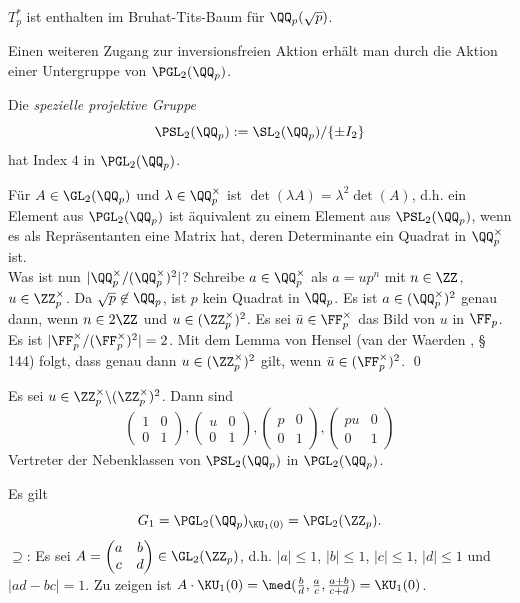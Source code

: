 $T_p^*$ ist enthalten im Bruhat-Tits-Baum für $\QQ_p(\sqrt{p})$.

Einen weiteren Zugang zur inversionsfreien Aktion erhält man
durch die Aktion einer Untergruppe von $\PGL_2(\QQ_p)$.

\BEM Die \emph{spezielle projektive Gruppe}
\[
\PSL_2(\QQ_p) := \SL_2(\QQ_p)/\{\pm I_2\}
\]
hat Index $4$ in $\PGL_2(\QQ_p)$.

\bew Für $A\in\GL_2(\QQ_p)$ und $\lambda\in\QQ_p^\times$ ist
$\det(\lambda A)=\lambda^2\det(A)$, d.h. ein Element aus
$\PGL_2(\QQ_p)$ ist äquivalent zu einem Element aus
$\PSL_2(\QQ_p)$, wenn es als Repräsentanten eine Matrix hat,
deren Determinante ein Quadrat in $\QQ_p^\times$ ist.\\
Was ist nun $|\QQ_p^\times/(\QQ_p^\times)^2|$?
Schreibe $a\in \QQ_p^\times$ als $a=up^n$ mit $n\in\ZZ$,
$u\in\ZZ_p^\times$. Da $\sqrt{p}\not\in\QQ_p$, ist $p$ kein Quadrat
in $\QQ_p$.
Es ist $a\in(\QQ_p^\times)^2$ genau dann,
wenn $n\in 2\ZZ$ und $u\in(\ZZ_p^\times)^2$. Es sei
$\bar{u}\in\FF_p^\times$ das Bild von $u$ in $\FF_p$.
Es ist $|\FF_p^\times/(\FF_p^\times)^2|=2$. Mit dem Lemma von Hensel
(van der Waerden \cite{vdW}, § 144)
folgt, dass genau dann $u\in(\ZZ_p^\times)^2$ gilt, wenn
$\bar{u}\in(\FF_p^\times)^2$.
\qed

\FOLG Es sei $u\in\ZZ_p^\times\backslash(\ZZ_p^\times)^2$. Dann sind
\[
\begin{pmatrix}
1 & 0 \\
0 & 1
\end{pmatrix},
\begin{pmatrix}
u & 0 \\
0 & 1
\end{pmatrix},
\begin{pmatrix}
p & 0 \\
0 & 1
\end{pmatrix},
\begin{pmatrix}
pu & 0 \\
0 & 1
\end{pmatrix}
\]
Vertreter der Nebenklassen von $\PSL_2(\QQ_p)$ in $\PGL_2(\QQ_p)$.

\PROP\label{prop_stab_K}
Es gilt
\[
G_1 = \PGL_2(\QQ_p)_{\KU_1(0)} = \PGL_2(\ZZ_p).
\]
\bew
\glqq$\supseteq$\grqq:
Es sei $A=\begin{pmatrix}
a & b \\
c & d
\end{pmatrix}
\in\GL_2(\ZZ_p)$, d.h. $|a|\leq 1$, $|b|\leq 1$, $|c|\leq 1$,
$|d|\leq 1$ und $|ad-bc|=1$.
Zu zeigen ist
$A\cdot\KU_1(0)=\med(\frac{b}{d},\frac{a}{c},\frac{a+b}{c+d})
=\KU_1(0)$.


